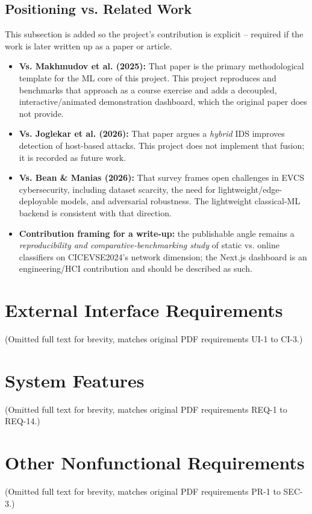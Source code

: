 \documentclass[11pt, a4paper]{article}
\begin{document}
\subsection{Positioning vs. Related Work}
This subsection is added so the project's contribution is explicit – required if the work is later written up as a paper or article.
\begin{itemize}
    \item \textbf{Vs. Makhmudov et al. (2025):} That paper is the primary methodological template for the ML core of this project. This project reproduces and benchmarks that approach as a course exercise and adds a decoupled, interactive/animated demonstration dashboard, which the original paper does not provide.
    \item \textbf{Vs. Joglekar et al. (2026):} That paper argues a \textit{hybrid} IDS improves detection of host-based attacks. This project does not implement that fusion; it is recorded as future work.
    \item \textbf{Vs. Bean \& Manias (2026):} That survey frames open challenges in EVCS cybersecurity, including dataset scarcity, the need for lightweight/edge-deployable models, and adversarial robustness. The lightweight classical-ML backend is consistent with that direction.
    \item \textbf{Contribution framing for a write-up:} the publishable angle remains a \textit{reproducibility and comparative-benchmarking study} of static vs. online classifiers on CICEVSE2024’s network dimension; the Next.js dashboard is an engineering/HCI contribution and should be described as such.
\end{itemize}

\section{External Interface Requirements}
(Omitted full text for brevity, matches original PDF requirements UI-1 to CI-3.)

\section{System Features}
(Omitted full text for brevity, matches original PDF requirements REQ-1 to REQ-14.)

\section{Other Nonfunctional Requirements}
(Omitted full text for brevity, matches original PDF requirements PR-1 to SEC-3.)
\end{document}
